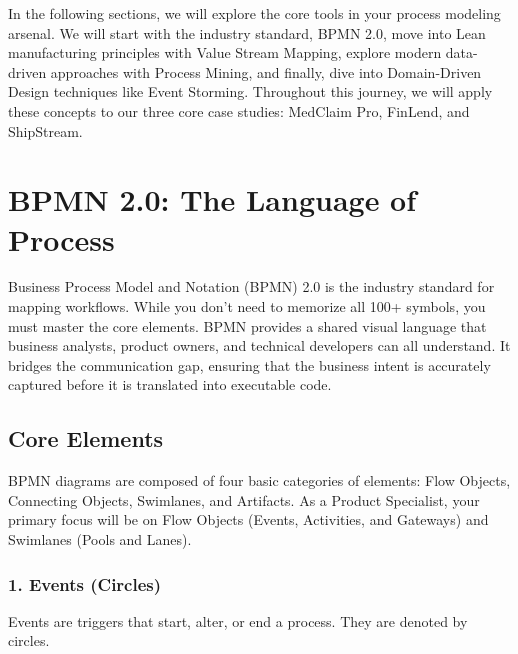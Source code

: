 \documentclass[
  11pt,
  openany,
  oneside]{book}
\begin{document}
In the following sections, we will explore the core tools in your
process modeling arsenal. We will start with the industry standard, BPMN
2.0, move into Lean manufacturing principles with Value Stream Mapping,
explore modern data-driven approaches with Process Mining, and finally,
dive into Domain-Driven Design techniques like Event Storming.
Throughout this journey, we will apply these concepts to our three core
case studies: MedClaim Pro, FinLend, and ShipStream.

\bigskip

\section{BPMN 2.0: The Language of
Process}\label{bpmn-2.0-the-language-of-process}

Business Process Model and Notation (BPMN) 2.0 is the industry standard
for mapping workflows. While you don't need to memorize all 100+
symbols, you must master the core elements. BPMN provides a shared
visual language that business analysts, product owners, and technical
developers can all understand. It bridges the communication gap,
ensuring that the business intent is accurately captured before it is
translated into executable code.

\subsection{Core Elements}\label{core-elements}

BPMN diagrams are composed of four basic categories of elements: Flow
Objects, Connecting Objects, Swimlanes, and Artifacts. As a Product
Specialist, your primary focus will be on Flow Objects (Events,
Activities, and Gateways) and Swimlanes (Pools and Lanes).

\subsubsection{1. Events (Circles)}\label{events-circles}

Events are triggers that start, alter, or end a process. They are
denoted by circles.
\end{document}
